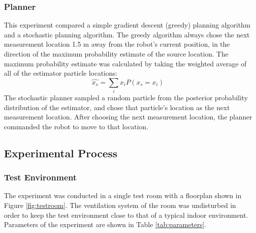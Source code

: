 \documentclass[submit, 12pt]{aiaa-pretty-modified}
\newcommand{\Tablewidthtwo}[0]{3in}
\begin{document}
\subsubsection{Planner}
This experiment compared a simple gradient
descent (greedy) planning algorithm and
a stochastic planning algorithm. The greedy algorithm always chose the
next measurement location 1.5 m away from the robot's current
position, in the direction of the maximum probability estimate of the source location. The
maximum probability estimate was calculated by taking the weighted average of
all of the estimator particle locations:
\[\hat{x_s} = \displaystyle\sum\limits_{i} x_i P(x_s = x_i) \]
The stochastic planner sampled a random particle from the posterior probability 
distribution of the estimator, and chose that particle's location as
the next measurement location.  After choosing the next measurement
location, the planner commanded the robot to move to that location.



\subsection{Experimental Process}
\subsubsection{Test Environment}

The experiment was conducted in a single test room with a floorplan
shown in Figure \ref{fig:testroom}. The ventilation system of the room was undisturbed in order to keep the test
environment close to that of a typical indoor environment. Parameters of the
experiment are shown in Table \ref{tab:parameters}.
\end{document}
